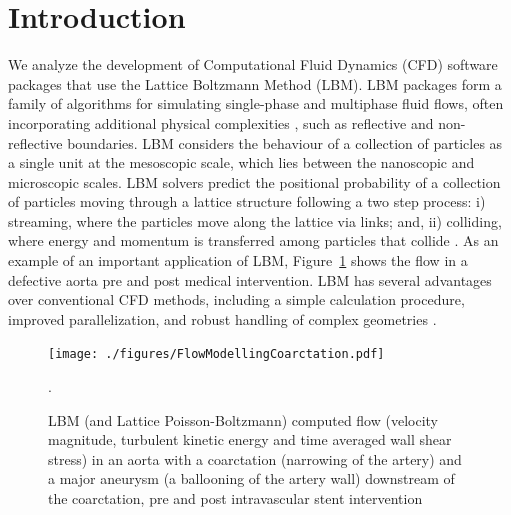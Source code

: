 \documentclass[final, 3p, times, authoryear]{elsarticle}
\begin{document}

\section{Introduction} \label{secIntro}

We analyze the development of Computational Fluid Dynamics (CFD) software
packages that use the Lattice Boltzmann Method (LBM). LBM packages form a family
of algorithms for simulating single-phase and multiphase fluid flows, often
incorporating additional physical complexities \citep{chen1998lattice}, such as
reflective and non-reflective boundaries. LBM considers the behaviour of a
collection of particles as a single unit at the mesoscopic scale, which lies
between the nanoscopic and microscopic scales. LBM solvers predict the
positional probability of a collection of particles moving through a lattice
structure following a two step process: i) streaming, where the particles move
along the lattice via links; and, ii) colliding, where energy and momentum is
transferred among particles that collide \citep{bao2011lattice}. As an example
of an important application of LBM, Figure~\ref{Fig_coarctation} shows the flow
in a defective aorta pre and post medical intervention. LBM has several
advantages over conventional CFD methods, including a simple calculation
procedure, improved parallelization, and robust handling of complex geometries
\citep{ganji2015application}.

\begin{figure}[h!]
	\begin{center}
		\texttt{[image: ./figures/FlowModellingCoarctation.pdf]}
		\caption{LBM (and Lattice Poisson-Boltzmann) computed flow (velocity
		magnitude, turbulent kinetic energy and time averaged wall shear stress)
		in an aorta with a coarctation (narrowing of the artery) and a major
		aneurysm (a ballooning of the artery wall) downstream of the
		coarctation, pre and post intravascular stent intervention
		\citep{SadeghiEtAl2020}}.
		\label{Fig_coarctation}
	\end{center}
\end{figure}
\end{document}
